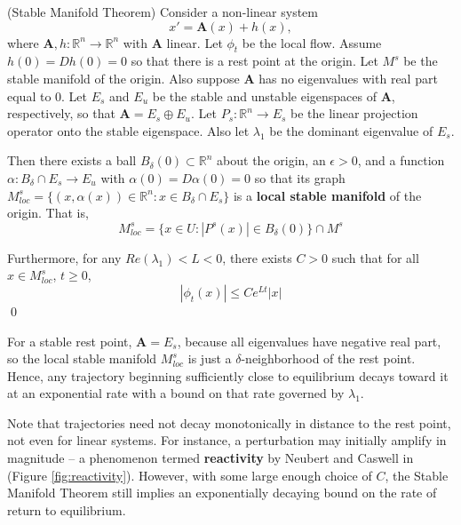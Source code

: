\begin{theorem}(Stable Manifold Theorem)
	Consider a non-linear system 
	$$x' = \mathbf{A}(x) + h(x),$$ 
	where $\mathbf{A}, h: \mathbb{R}^n \to \mathbb{R}^n$ with $\mathbf{A}$ linear.  Let $\phi_t$ be the local flow.
	Assume $h(0) =  Dh(0)=0$ so that there is a rest point at the origin. Let $M^s$ be the stable manifold of the origin. 
	Also suppose $\mathbf{A}$ has no eigenvalues with real part equal to 0. Let $E_s$ and $E_u$ be the stable and unstable eigenspaces of $\mathbf{A}$, respectively, so that $\textbf{A} = E_s \oplus E_u$. Let $P_s: \mathbb{R}^n \to E_s$ %
	be the linear projection operator onto the stable %
	eigenspace. Also let $\lambda_1$ be the dominant eigenvalue of $E_s$. 
	
	Then there exists a ball $B_\delta(0) \subset \mathbb{R}^n$ about the origin, 
	an $\epsilon > 0$, 
	and a function $\alpha: B_\delta \cap E_s \to E_u $ with $\alpha(0)  = D\alpha(0) = 0$ 
	so that its graph $M^s_{loc} = \{(x, \alpha(x)) \in \mathbb{R}^n : x \in B_\delta \cap E_s\}$ is a \textbf{local stable manifold} of the origin. 
	That is, $$M^s_{loc} = \{x \in U : |P^s(x)| \in B_\delta(0)\} \cap M^s$$
	
	Furthermore, for any $Re(\lambda_1) < L < 0$, there exists $C >0$ such that for all $x \in M^s_{loc}$, $t \geq 0$,
	$$|\phi_t(x)| \leq Ce^{Lt}|x|$$ \qed
\end{theorem}

For a stable rest point, $\mathbf{A} = E_s$, because all eigenvalues have negative real part, so the local stable manifold $M^s_{loc}$ is just a $\delta$-neighborhood of the rest point. Hence, any trajectory beginning sufficiently close to equilibrium decays toward it at an exponential rate with a bound on that rate governed by $\lambda_1$. 


Note that trajectories need not decay monotonically in distance to the rest point, not even for linear systems. For instance, a perturbation may initially amplify in magnitude -- a phenomenon termed \textbf{reactivity} by Neubert and Caswell in \cite{neubertAlternativesResilienceMeasuring1997a} (Figure \ref{fig:reactivity}). However, with some large enough choice of $C$, the Stable Manifold Theorem still implies an exponentially decaying bound on the rate of return to equilibrium. 

